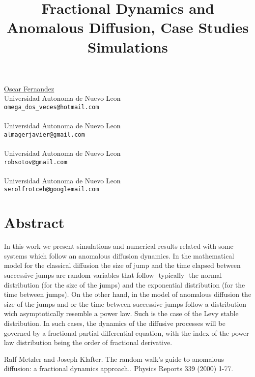 \title{Fractional Dynamics and Anomalous Diffusion, Case Studies Simulations}
\author{}  \institute{}
\maketitle
\begin{center}
{\large \underline{Oscar  Fernandez}}\\
Universidad Autonoma de Nuevo Leon\\
{\tt omega\_dos\_veces@hotmail.com}
\\ \vspace{4mm}{\large Javier Almaguer}\\
Universidad Autonoma de Nuevo Leon\\
{\tt almagerjavier@gmail.com}
\\ \vspace{4mm}{\large Roberto Soto}\\
Universidad Autonoma de Nuevo Leon\\
{\tt robsotov@gmail.com}
\\ \vspace{4mm}{\large Hector  Flores}\\
Universidad Autonoma de Nuevo Leon\\
{\tt serolfrotceh@googlemail.com}

\end{center}

\section*{Abstract}


In this work we present 
simulations and numerical
results related with some 
systems which follow an 
anomalous diffusion dynamics. 
In the mathematical model for 
the classical diffusion the 
size of jump and the time 
elapsed between successive jumps 
are random variables that 
follow -typically- the normal 
distribution (for the size of the jumps) 
and the exponential distribution 
(for the time between jumps). 
On the other hand, in the model 
of anomalous diffusion the size 
of the jumps and or the time 
between successive jumps follow 
a distribution wich asymptotically 
resemble a power law. Such is the 
case of the Levy stable distribution. 
In such cases, the dynamics of the 
diffusive processes will be governed 
by a fractional partial differential 
equation, with the  index of the 
power law distribution being
the order of fractional derivative.


\begin{thebibliography}{10}

{\sc Ralf Metzler and Joseph Klafter}. {The random walk's guide to anomalous diffusion: a fractional dynamics approach.}. Physics Reports  339 (2000) 1-77.

\end{thebibliography}
